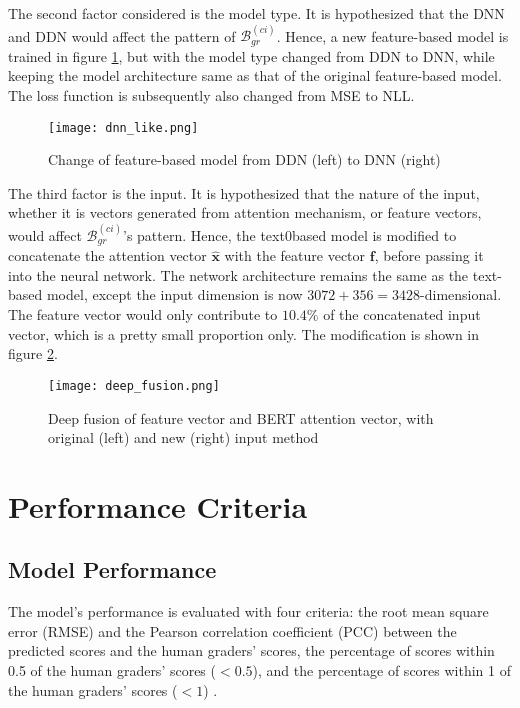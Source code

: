 The second factor considered is the model type. It is hypothesized that the DNN and DDN would affect the pattern of $\mathcal{B}^{(ci)}_{gr}$. Hence, a new feature-based model is trained in figure \ref{fig:dnn_like}, but with the model type changed from DDN to DNN, while keeping the model architecture same as that of the original feature-based model. The loss function is subsequently also changed from MSE to NLL.

\begin{figure}[H]
  \centering
  \texttt{[image: dnn\_like.png]}
  \caption{Change of feature-based model from DDN (left) to DNN (right)}
  \label{fig:dnn_like}
\end{figure}

The third factor is the input. It is hypothesized that the nature of the input, whether it is vectors generated from attention mechanism, or feature vectors, would affect $\mathcal{B}^{(ci)}_{gr}$'s pattern. Hence, the text0based model is modified to concatenate the attention vector $\mathbf{\hat{x}}$ with the feature vector $\mathbf{f}$, before passing it into the neural network. The network architecture remains the same as the text-based model, except the input dimension is now $3072 + 356 = 3428$-dimensional. The feature vector would only contribute to $10.4\%$ of the concatenated input vector, which is a pretty small proportion only. The modification is shown in figure \ref{fig:deep_fusion}.

\begin{figure}[H]
  \centering
  \texttt{[image: deep\_fusion.png]}
  \caption{Deep fusion of feature vector and BERT attention vector, with original (left) and new (right) input method}
  \label{fig:deep_fusion}
\end{figure}

\section{Performance Criteria} \label{sec:performance_criteria}
\subsection{Model Performance}
The model's performance is evaluated with four criteria: the root mean square error (RMSE) and the Pearson correlation coefficient (PCC)  between the predicted scores and the human graders' scores, the percentage of scores within 0.5 of the human graders' scores ($< 0.5$),   and the percentage of scores within 1 of the human graders' scores ($< 1$) .

